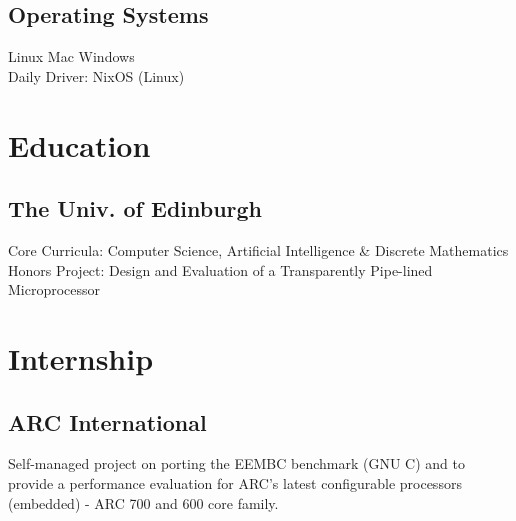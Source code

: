 \begin{minipage}[t]{0.25\textwidth}
\subsection{Operating Systems}\label{subsec:operating-systems}
\sectionsep
Linux
\textbullet{} Mac
\textbullet{} Windows \\
Daily Driver: NixOS (Linux)

\section{Education}\label{sec:education}
\subsection{The Univ. of Edinburgh}\label{subsec:the-university-of-edinburgh}
Core Curricula: Computer Science, Artificial Intelligence \& Discrete Mathematics \\
Honors Project: Design and Evaluation of a Transparently Pipe-lined Microprocessor

\section{Internship}\label{sec:internship}
\subsection{ARC International}\label{subsec:arc-international}
Self-managed project on porting the EEMBC benchmark (GNU C) and to provide a performance evaluation for ARC’s latest configurable processors (embedded) - ARC 700 and 600 core family.

\end{minipage}

